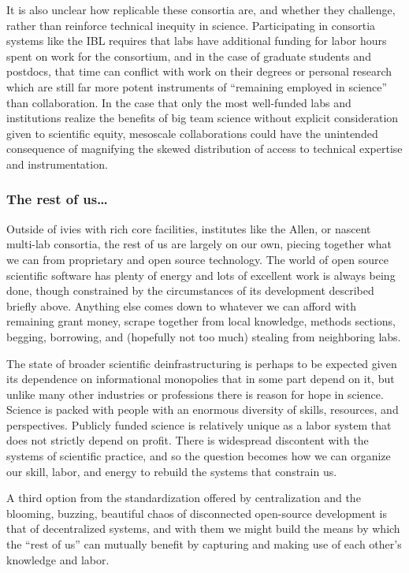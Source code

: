 \documentclass[10pt]{article}
\begin{document}
\begin{multicols}{2}
It is also unclear how replicable these consortia are, and whether they
challenge, rather than reinforce technical inequity in science.
Participating in consortia systems like the IBL requires that labs have
additional funding for labor hours spent on work for the consortium, and
in the case of graduate students and postdocs, that time can conflict
with work on their degrees or personal research which are still far more
potent instruments of ``remaining employed in science'' than
collaboration. In the case that only the most well-funded labs and
institutions realize the benefits of big team science without explicit
consideration given to scientific equity, mesoscale collaborations could
have the unintended consequence of magnifying the skewed distribution of
access to technical expertise and instrumentation.

\hypertarget{the-rest-of-us}{%
\subsubsection{The rest of us\ldots{}}\label{the-rest-of-us}}

Outside of ivies with rich core facilities, institutes like the Allen,
or nascent multi-lab consortia, the rest of us are largely on our own,
piecing together what we can from proprietary and open source
technology. The world of open source scientific software has plenty of
energy and lots of excellent work is always being done, though
constrained by the circumstances of its development described briefly
above. Anything else comes down to whatever we can afford with remaining
grant money, scrape together from local knowledge, methods sections,
begging, borrowing, and (hopefully not too much) stealing from
neighboring labs.

The state of broader scientific deinfrastructuring is perhaps to be
expected given its dependence on informational monopolies that in some
part depend on it, but unlike many other industries or professions there
is reason for hope in science. Science is packed with people with an
enormous diversity of skills, resources, and perspectives. Publicly
funded science is relatively unique as a labor system that does not
strictly depend on profit. There is widespread discontent with the
systems of scientific practice, and so the question becomes how we can
organize our skill, labor, and energy to rebuild the systems that
constrain us.

A third option from the standardization offered by centralization and
the blooming, buzzing, beautiful chaos of disconnected open-source
development is that of decentralized systems, and with them we might
build the means by which the ``rest of us'' can mutually benefit by
capturing and making use of each other's knowledge and labor.

\end{multicols}
\end{document}
